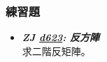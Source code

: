 \subsubsection*{練習題}
\begin{itemize}[label={\Checkmark}]
\item \textbf{\textit{ZJ \href{http://zerojudge.tw/ShowProblem?problemid=d623}{d623}: 反方陣}}\\
求二階反矩陣。
\end{itemize}